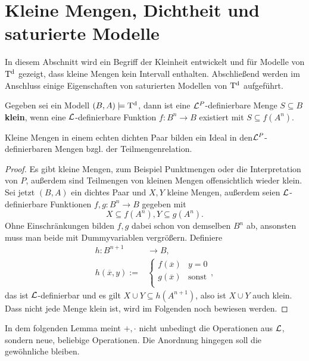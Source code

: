 \section{Kleine Mengen, Dichtheit und saturierte Modelle}
In diesem Abschnitt wird ein Begriff der Kleinheit entwickelt und für Modelle von $\operatorname{T^d}$ gezeigt, dass kleine Mengen kein Intervall enthalten. Abschließend werden im Anschluss einige Eigenschaften von saturierten Modellen von $\operatorname{T^d}$ aufgeführt.
\begin{definition}
	Gegeben sei ein Modell $(B,A)\models\operatorname{T^d}$, dann ist eine $\mathcal{L}^P$-definierbare Menge $S\subseteq B$ \textbf{klein}, wenn eine $\mathcal{L}$-definierbare Funktion $f:B^n\rightarrow B$ existiert mit $S\subseteq f(A^n)$.
\end{definition}

\begin{lemma}
	Kleine Mengen in einem echten dichten Paar bilden ein Ideal in den\linebreak $\mathcal{L}^P$-definierbaren Mengen bzgl. der Teilmengenrelation.
\end{lemma}
\begin{proof}
	Es gibt kleine Mengen, zum Beispiel Punktmengen oder die Interpretation von $P$, außerdem sind Teilmengen von kleinen Mengen offensichtlich wieder klein.\\
	Sei jetzt $(B,A)$ ein dichtes Paar und $X,Y$ kleine Mengen, außerdem seien $\mathcal{L}$-definierbare Funktionen $f,g:B^n\rightarrow B$ gegeben mit $$X\subseteq f(A^n),Y\subseteq g(A^n).$$ Ohne Einschränkungen bilden $f,g$ dabei schon von demselben $B^n$ ab, ansonsten muss man beide mit Dummyvariablen vergrößern. Definiere
	\begin{align*}
	h:B^{n+1}&\rightarrow B,\\
	h(\overline{x},y):=&\left\{\begin{array}{ll}
	f(\overline{x})&y=0\\
	g(\overline{x})&\text{sonst}\\
	\end{array}\right.,
	\end{align*}
	das ist $\mathcal{L}$-definierbar und es gilt $X\cup Y\subseteq h(A^{n+1})$, also ist $X\cup Y$ auch klein.\\
	Dass nicht jede Menge klein ist, wird im Folgenden noch bewiesen werden.
\end{proof}

In dem folgenden Lemma meint $+,\cdot$ nicht unbedingt die Operationen aus $\mathcal{L}$, sondern neue, beliebige Operationen. Die Anordnung hingegen soll die gewöhnliche bleiben.

